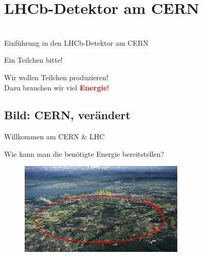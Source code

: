    \section{LHCb-Detektor am CERN}
\begin{frame}[plain]

\begin{center} 
  \huge{   }\\
   \Large{ Einführung in den LHCb-Detektor am CERN}

\end{center}
\end{frame}


\begin{frame}{Ein Teilchen bitte!}

    \begin{center}
   \Large Wir wollen Teilchen produzieren!\\
    
    \Large Dazu brauchen wir viel \textbf{\textcolor{red}{Energie}}!
        
    \end{center}
    
\end{frame}
\subsection{Bild: CERN, verändert}
\begin{frame}{Willkommen am CERN \& LHC}

  \begin{center}
   \Large Wie kann man die benötigte Energie bereitstellen?
    \end{center}
    
    \begin{figure}[h]
        \centering
        \includegraphics[width=0.7\textwidth]{Figures Introductory Lecture/LHCb Detector/LHC.jpg}
        \label{fig:CERN_LHC}
    \end{figure}
\end{frame}

